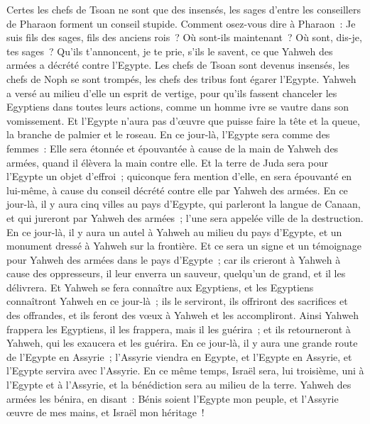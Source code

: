 \begin{multicols}{2}
Certes les chefs de Tsoan ne sont que des insensés, les sages d'entre les conseillers de Pharaon forment un conseil stupide. Comment osez-vous dire à Pharaon~: Je suis fils des sages, fils des anciens rois~?
Où sont-ils maintenant~? Où sont, dis-je, tes sages~? Qu'ils t'annoncent, je te prie, s'ils le savent, ce que Yahweh des armées a décrété contre l'Egypte.
Les chefs de Tsoan sont devenus insensés, les chefs de Noph se sont trompés, les chefs des tribus font égarer l'Egypte.
Yahweh a versé au milieu d'elle un esprit de vertige, pour qu'ils fassent chanceler les Egyptiens dans toutes leurs actions, comme un homme ivre se vautre dans son vomissement.
Et l'Egypte n’aura pas d’œuvre que puisse faire la tête et la queue, la branche de palmier et le roseau.
En ce jour-là, l'Egypte sera comme des femmes~: Elle sera étonnée et épouvantée à cause de la main de Yahweh des armées, quand il élèvera la main contre elle.
Et la terre de Juda sera pour l'Egypte un objet d'effroi~; quiconque fera mention d'elle, en sera épouvanté en lui-même, à cause du conseil décrété contre elle par Yahweh des armées.
En ce jour-là, il y aura cinq villes au pays d'Egypte, qui parleront la langue de Canaan, et qui jureront par Yahweh des armées~; l'une sera appelée ville de la destruction.
En ce jour-là, il y aura un autel à Yahweh au milieu du pays d'Egypte, et un monument dressé à Yahweh sur la frontière.
Et ce sera un signe et un témoignage pour Yahweh des armées dans le pays d'Egypte~; car ils crieront à Yahweh à cause des oppresseurs, il leur enverra un sauveur, quelqu'un de grand, et il les délivrera.
Et Yahweh se fera connaître aux Egyptiens, et les Egyptiens connaîtront Yahweh en ce jour-là~; ils le serviront, ils offriront des sacrifices et des offrandes, et ils feront des vœux à Yahweh et les accompliront.
Ainsi Yahweh frappera les Egyptiens, il les frappera, mais il les guérira~; et ils retourneront à Yahweh, qui les exaucera et les guérira.
En ce jour-là, il y aura une grande route de l'Egypte en Assyrie~; l'Assyrie viendra en Egypte, et l'Egypte en Assyrie, et l'Egypte servira avec l'Assyrie.
En ce même temps, Israël sera, lui troisième, uni à l'Egypte et à l'Assyrie, et la bénédiction sera au milieu de la terre.
Yahweh des armées les bénira, en disant~: Bénis soient l'Egypte mon peuple, et l'Assyrie œuvre de mes mains, et Israël mon héritage~!

\end{multicols}
